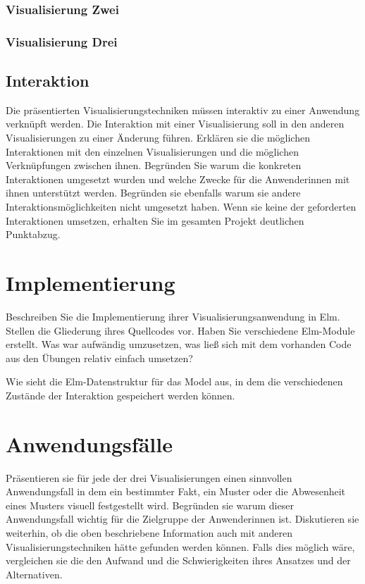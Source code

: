 \documentclass[usegeometry=true]{scrartcl}
\begin{document}
\subsubsection{Visualisierung Zwei}
\subsubsection{Visualisierung Drei}

\subsection{Interaktion}
Die präsentierten Visualisierungstechniken müssen interaktiv zu einer Anwendung verknüpft werden.
Die Interaktion mit einer Visualisierung soll in den anderen Visualisierungen zu einer Änderung führen. 
Erklären sie die möglichen Interaktionen mit den einzelnen Visualisierungen und die möglichen Verknüpfungen zwischen ihnen. Begründen Sie warum die konkreten Interaktionen umgesetzt wurden und welche Zwecke für die Anwenderinnen mit ihnen unterstützt werden. Begründen sie ebenfalls warum sie andere Interaktionsmöglichkeiten nicht umgesetzt haben. Wenn sie keine der geforderten Interaktionen umsetzen, erhalten Sie im gesamten Projekt deutlichen Punktabzug. 

\section{Implementierung}
Beschreiben Sie die Implementierung ihrer Visualisierungsanwendung in Elm. Stellen die Gliederung ihres Quellcodes vor. Haben Sie verschiedene Elm-Module erstellt. Was war aufwändig umzusetzen, was ließ sich mit dem vorhanden Code aus den Übungen relativ einfach umsetzen? 

Wie sieht die Elm-Datenstruktur für das Model aus, in dem die verschiedenen Zustände der Interaktion gespeichert werden können.

\section{Anwendungsfälle}
Präsentieren sie für jede der drei Visualisierungen einen sinnvollen Anwendungsfall in dem ein bestimmter Fakt, ein Muster oder die Abwesenheit eines Musters visuell festgestellt wird. Begründen sie warum dieser Anwendungsfall wichtig für die Zielgruppe der Anwenderinnen ist. Diskutieren sie weiterhin, ob die oben beschriebene Information auch mit anderen Visualisierungstechniken hätte gefunden werden können. Falls dies möglich wäre, vergleichen sie die den Aufwand und die Schwierigkeiten ihres Ansatzes und der Alternativen. 
\end{document}
